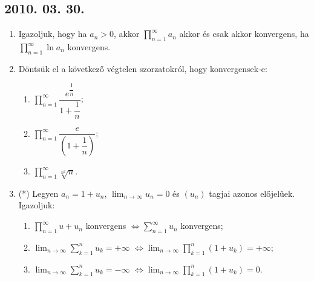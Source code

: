 \documentclass{article}
\newenvironment{abc}{\begin{enumerate}[label=\textit{\alph*})]}{\end{enumerate}}
\begin{document}
\subsection*{2010. 03. 30.}
\begin{enumerate}
\item Igazoljuk, hogy ha $a_n>0$, akkor $\displaystyle\prod_{n=1}^{\infty} a_n$ akkor és csak akkor konvergens, ha $\displaystyle\prod_{n=1}^{\infty} \ln a_n$ konvergens.
\item Döntsük el a következő végtelen szorzatokról, hogy konvergensek-e:
	\begin{abc}
	\item $\displaystyle\prod_{n=1}^{\infty} \dfrac{e^{\dfrac{1}{n}}}{1+\dfrac{1}{n}}$; 
    \item $\displaystyle\prod_{n=1}^{\infty} \dfrac{e}{\left(1+\dfrac{1}{n}\right)}$;
    \item $\displaystyle\prod_{n=1}^{\infty} \sqrt[n^2]{n}$.
	\end{abc}
\item (*) Legyen $a_n=1+u_n$, $\displaystyle\lim_{n \to \infty}u_n=0$ és $(u_n)$ tagjai azonos előjelűek. Igazoljuk:
	\begin{abc}
	\item $\displaystyle\prod_{n=1}^{\infty} u+u_n$ konvergens $\iff \displaystyle\sum_{n=1}^{\infty}u_n$ konvergens;
    \item $\displaystyle\lim_{n \to \infty} \displaystyle\sum_{k=1}^{n} u_k=+\infty$ $\iff \displaystyle\lim_{n \to \infty} \displaystyle\prod_{k=1}^{n} (1+u_k)=+\infty$;
    \item $\displaystyle\lim_{n \to \infty} \displaystyle\sum_{k=1}^{n} u_k=-\infty$ $\iff \displaystyle\lim_{n \to \infty} \displaystyle\prod_{k=1}^{n} (1+u_k)=0$.
	\end{abc}
\end{enumerate}
\end{document}

